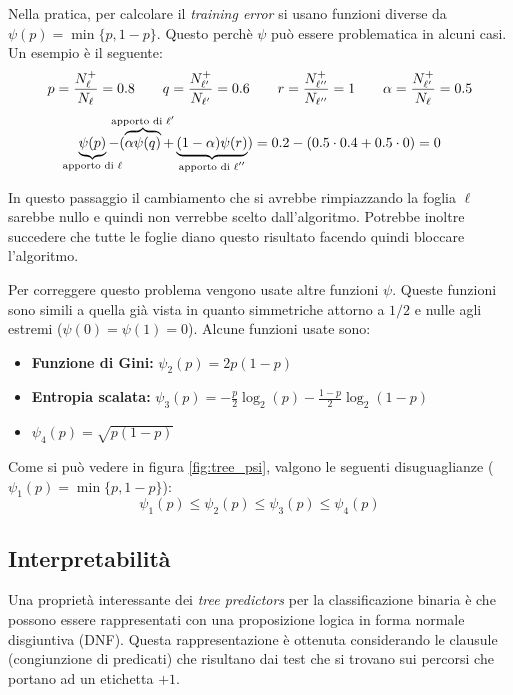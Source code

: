 Nella pratica, per calcolare il \textit{training error} si usano funzioni diverse da
$\psi(p) = \min{\{p,1-p\}}$. Questo perchè $\psi$ può essere problematica in alcuni
casi. Un esempio è il seguente:
$$ \begin{aligned}
p=\frac{N_{\ell}^+}{N_{\ell}}=0.8 \quad & \quad q=\frac{N_{\ell'}^+}{N_{\ell'}}=0.6
& \quad r=\frac{N_{\ell''}^+}{N_{\ell''}}=1 \quad & \quad \alpha=\frac{N_{\ell'}^+}{N_{\ell}}=0.5\\
\end{aligned} $$
$$ \underbrace{\psi(p)}_{\mathclap{\text{apporto di $\ell$}}} - 
( \overbrace{\alpha\psi(q)}^{\mathclap{\text{apporto di $\ell'$}}}+
\underbrace{(1-\alpha)\psi(r)}_{\mathclap{\text{apporto di $\ell''$}}})
= 0.2-(0.5\cdot0.4+0.5\cdot0) = 0 $$

In questo passaggio il cambiamento che si avrebbe rimpiazzando la foglia $\ell$ sarebbe
nullo e quindi non verrebbe scelto dall'algoritmo. Potrebbe inoltre succedere che tutte
le foglie diano questo risultato facendo quindi bloccare l'algoritmo.

Per correggere questo problema vengono usate altre funzioni $\psi$. Queste funzioni sono
simili a quella già vista in quanto simmetriche attorno a $1/2$ e nulle agli estremi
($\psi(0)=\psi(1)=0$). Alcune funzioni usate sono:

\begin{itemize}
    \item \textbf{Funzione di Gini:} $\psi_2(p) = 2p(1-p)$
    \item \textbf{Entropia scalata:} $\displaystyle \psi_3(p) =
        -\frac{p}{2}\log_2{(p)}-\frac{1-p}{2}\log_2{(1-p)}$
    \item $\psi_4(p) = \sqrt{p(1-p)}$
\end{itemize}

Come si può vedere in figura \ref{fig:tree_psi}, valgono le seguenti disuguaglianze
($\psi_1(p) = \min{\{p,1-p\}}$):
$$ \psi_1(p) \leq \psi_2(p) \leq \psi_3(p) \leq \psi_4(p) $$

\begin{center}
    \captionsetup{type=figure}
    
\end{center}

\subsection{Interpretabilità}
Una proprietà interessante dei \textit{tree predictors} per la classificazione binaria
è che possono essere rappresentati con una proposizione logica in forma normale
disgiuntiva (DNF). Questa rappresentazione è ottenuta considerando le clausule
(congiunzione di predicati) che risultano dai test che si trovano sui percorsi che
portano ad un etichetta $+1$.


